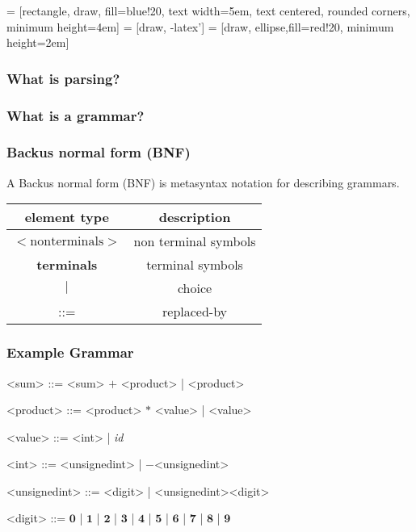 \documentclass{beamer}
\begin{document}


 = [rectangle, draw, fill=blue!20, 
    text width=5em, text centered, rounded corners, minimum height=4em]
 = [draw, -latex']
 = [draw, ellipse,fill=red!20,
    minimum height=2em]
    

\begin{frame}
\frametitle{What is parsing?}
\begin{center}
\scalebox{0.8}
{
}
\end{center}
\end{frame}

\begin{frame}
\frametitle{What is a grammar?}
\end{frame}


\begin{frame}[fragile]
\frametitle{Backus normal form (BNF)}
A Backus normal form (BNF) is metasyntax notation for describing grammars.

\begin{center}
  \begin{tabular}{ | c | c | }
    \hline
    element type & description \\ \hline\hline
    $<\mathrm{non terminals}>$ & non terminal symbols  \\ \hline
    \textbf{terminals} & terminal symbols  \\ \hline
    $|$ & choice  \\ \hline
    ::= & replaced-by  \\
    \hline
  \end{tabular}
\end{center}

\end{frame}

\begin{frame}[fragile]
\frametitle{Example Grammar}
\begin{grammar}
<sum> ::= <sum> $\mathbf{+}$ <product> | <product>

<product> ::= <product> $\mathbf{*}$ <value> | <value>

<value> ::= <int> | \textit{id}

<int> ::= <unsignedint> | $\mathbf{-}$<unsignedint>

<unsignedint> ::= <digit> | <unsignedint><digit>

<digit> ::= $\mathbf{0}$ | $\mathbf{1}$ | $\mathbf{2}$ | $\mathbf{3}$ | $\mathbf{4}$ | $\mathbf{5}$ | $\mathbf{6}$ | $\mathbf{7}$ | $\mathbf{8}$ | $\mathbf{9}$
 \end{grammar}
\end{frame}
\end{document}
